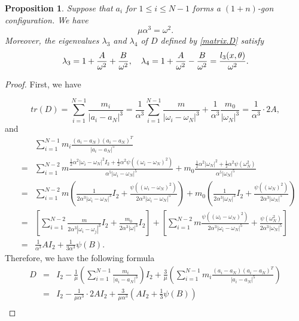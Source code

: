 \documentclass[10pt,a4paper]{amsart}
\newtheorem{proposition}{Proposition}
\def\lm{{\lambda}}
\begin{document}
 \begin{proposition}\label{polygon.prop.lm3.lm4}
	Suppose that $a_i$ for $1\leq i \leq N-1$ forms a $(1+n)$-gon configuration. We have
    $$\mu\alpha^3=\omega^2.$$
    Moreover, the eigenvalues $\lm_3$ and $\lm_4$ of $D$ defined by \eqref{matrix.D} satisfy
	\begin{align}
	\lm_3 = 1+{A\over\omega^2}+{B\over\omega^2},\quad
	\lm_4 = 1+{A\over\omega^2}-{B\over\omega^2}={l_3(x,\theta)\over\omega^2}.
	\end{align}
\end{proposition}

 \begin{proof}
First, we have
 
 \begin{displaymath}
 tr(D)=\sum_{i=1}^{N-1}\frac{m_i}{|a_i-a_N|^3}  
 =\frac{1}{\alpha^3}\sum_{i=1}^{N-1}\frac{m}{|\omega_i-\omega_N|^3}+\frac{1}{\alpha^3}\frac{m_0}{|\omega_N|^3}
 =\frac{1}{\alpha^3}\cdot 2A,
 \end{displaymath}
 and
 \begin{eqnarray*}
 	&&
 	\sum_{i=1}^{N-1}m_i\frac{(a_i-a_N)(a_i-a_N)^T}{|a_i-a_N|^5}
 	\\
 	&=&
 	\sum_{i=1}^{N-2}m\frac{\frac{1}{2}\alpha^2|\omega_i-\omega_N|^2I_2+\frac{1}{2}\alpha^2\psi((\omega_i-\omega_N)^2)}
 	{\alpha^5|\omega_i-\omega_ N|^5}+
 	m_0\frac{\frac{1}{2}\alpha^2|\omega_N|^2+\frac{1}{2}\alpha^2\psi(\omega_N^2)}{\alpha^5|\omega_N|^5}
 	\\
 	&=&
 	\sum_{i=1}^{N-2}m(\frac{1}{2\alpha^3|\omega_i-\omega_N|^3}I_2+\frac{\psi((\omega_i-\omega_N)^2)}{2\alpha^3|\omega_i-\omega_N|^5})+
 	m_0(\frac{1}{2\alpha^3|\omega_N|^3}I_2+\frac{\psi((\omega_N)^2)}{2\alpha^3|\omega_N|^5})\\
 	&=&
 	[\sum_{i=1}^{N-2}\frac{m}{2\alpha^3|\omega_i-\omega_j|^3}I_2+\frac{m_0}{2\alpha^3|\omega|^3}I_2]+
 	[\sum_{i=1}^{N-2}m\frac{\psi((\omega_i-\omega_N)^2)}{2\alpha^3|\omega_i-\omega_N|^5}+\frac{\psi(\omega_N^2)}{2\alpha^3|\omega_N|^5}]\\
 	&=&
 	\frac{1}{\alpha^3}AI_2+\frac{1}{3\alpha^3}\psi(B).
 \end{eqnarray*}
 Therefore, we have the following formula
 \begin{eqnarray*}
 	D&=&I_2-\frac{1}{\mu}(\sum_{i=1}^{N-1}\frac{m_i}{|a_i-a_N|^3})I_2+\frac{3}{\mu}(\sum_{i=1}^{N-1}m_i\frac{(a_i-a_N)(a_i-a_N)^T}{|a_i-a_N|^5})\\
 	&=&I_2-\frac{1}{\mu\alpha^3}\cdot 2AI_2+\frac{3}{\mu\alpha^3}(AI_2+\frac{1}{3}\psi(B))\\

\end{eqnarray*}
\end{proof}
\end{document}
